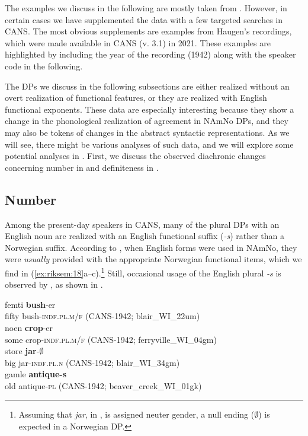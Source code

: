 \documentclass[output=paper]{langscibook}
\begin{document}
The examples we discuss in the following are mostly taken from \citet{Riksem2017}. However, in certain cases we have supplemented the data with a few targeted searches in CANS. The most obvious supplements are examples from Haugen’s recordings, which were made available in CANS (v. 3.1) in 2021. These examples are highlighted by including the year of the recording (1942) along with the speaker code in the following. 


\begin{sloppypar}
The DPs we discuss in the following subsections are either realized without an overt realization of functional features, or they are realized with English functional exponents. These data are especially interesting because they show a change in the phonological realization of agreement in NAmNo DPs, and they may also be tokens of changes in the abstract syntactic representations. As we will see, there might be various analyses of such data, and we will explore some potential analyses in . First, we discuss the observed diachronic changes concerning number in  and definiteness in . 
\end{sloppypar}

\subsection{Number}\label{sec:riksem:5.1}

Among the present-day speakers in CANS, many of the plural DPs with an English noun are realized with an English functional suffix (\textit{{}-s}) rather than a Norwegian suffix. According to \citet[440]{Haugen1953}, when English forms were used in NAmNo, they were \textit{usually} provided with the appropriate Norwegian functional items, which we find in (\ref{ex:riksem:18}a–c).\footnote{Assuming that \textit{jar}, in , is assigned neuter gender, a null ending (${\emptyset}$) is expected in a Norwegian DP.} Still, occasional usage of the English plural \textit{{}-s} is observed by \citet[450]{Haugen1953}, as shown in .\largerpage


\ea \label{ex:riksem:18}
\ea \label{ex:riksem:18a}
	\gll femti \textbf{bush}{}-er\\
		 fifty bush-\textsc{indf.pl.m/f} (CANS-1942; %
         blair\_WI\_22um)\\
\ex \label{ex:riksem:18b}
	\gll noen \textbf{crop}{}-er\\
		some crop-\textsc{indf.pl.m/f} (CANS-1942; %
        ferryville\_WI\_04gm)\\
\ex \label{ex:riksem:18c}
	\gll store \textbf{jar}{}-\textsc{${\emptyset}$}\\
		 big jar-\textsc{indf.pl.n} (CANS-1942; %
         blair\_WI\_34gm)\\
\ex \label{ex:riksem:18d}
	\gll gamle \textbf{antique-s}\\
		 old antique-\textsc{pl} (CANS-1942; %
         beaver\_creek\_WI\_01gk)\\
\z
\z
\end{document}
